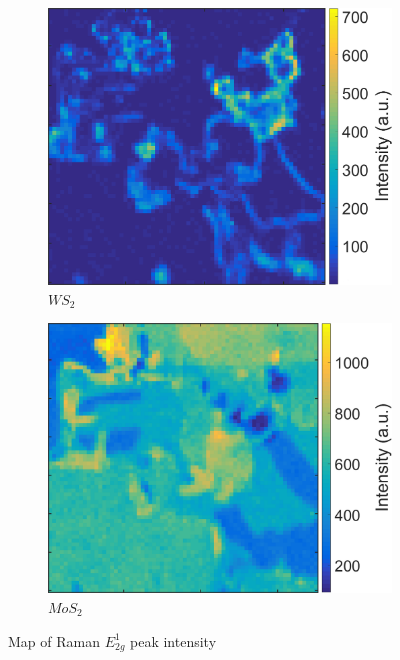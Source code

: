 \begin{figure}[H]
	\begin{center}
		\begin{subfigure}[b]{0.45\textwidth}
			\includegraphics[width=\textwidth]{Heterostructures/RamanIntensityMapEWS2.png}
			\caption{$WS_2$}
			\label{fig:HeterostructuresRamanIntensityEWS2}
		\end{subfigure}
		\begin{subfigure}[b]{0.45\textwidth}
			\includegraphics[width=\textwidth]{Heterostructures/RamanIntensityMapEMoS2.png}
			\caption{$MoS_2$}
			\label{fig:HeterostructuresRamanIntensityEMoS2}
		\end{subfigure}
		\caption{Map of Raman $E^1_{2g}$ peak intensity}
		\label{fig:HeterostructuresRamanIntensityE}
	\end{center}
\end{figure}

